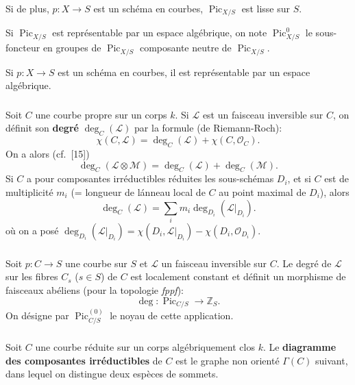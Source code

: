\documentclass{amsart}
\theoremstyle{plain}
\theoremstyle{remark}
\DeclareMathOperator{\Pic}{Pic}
\newcommand{\cO}{\mathcal{O}}
\newcommand{\cL}{\mathcal{L}}
\newcommand{\cM}{\mathcal{M}}
\newcommand{\bbZ}{\mathbb{Z}}
\begin{document}
Si de plus, $p: X \to S$ est un sch\'ema en courbes, $\Pic_{X/S}$ est lisse sur $S$.

Si $\Pic_{X/S}$ est repr\'esentable par un espace alg\'ebrique, on note $\Pic^0_{X/S}$ le
sous-foncteur en groupes de $\Pic_{X/S}$ composante neutre de $\Pic_{X/S}$.

Si $p: X \to S$ est un sch\'ema en courbes, il est repr\'esentable par un espace alg\'ebrique.

\subsubsection{}
Soit $C$ une courbe propre sur un corps $k$. Si $\cL$ est un faisceau inversible sur $C$,
on d\'efinit son \textbf{degr\'e} $\deg_C(\cL)$ par la formule (de Riemann-Roch):
\begin{equation}
\chi(C, \cL) = \deg_C(\cL) + \chi(C, \cO_C).
\end{equation}
On a alors (cf.~[15])
\begin{equation}
\deg_C(\cL \otimes \cM) = \deg_C(\cL) + \deg_C(\cM).
\end{equation}
Si $C$ a pour composantes irr\'eductibles r\'eduites les sous-sch\'emas $D_i$, et si $C$
est de multiplicit\'e $m_i$ (= longueur de l\'anneau local de $C$ au point maximal de $D_i$),
alors
\begin{equation}
\deg_C(\cL) = \sum_i m_i \deg_{D_i}(\cL|_{D_i}).
\end{equation}
o\`u on a pos\'e $\deg_{D_i}(\cL|_{D_i}) = \chi(D_i, \cL|_{D_i}) - \chi(D_i, \cO_{D_i})$.

\subsubsection{}
Soit $p: C \to S$ une courbe sur $S$ et $\cL$ un faisceau inversible sur $C$. Le degr\'e
de $\cL$ sur les fibres $C_s$ ($s \in S$) de $C$ est localement constant et d\'efinit un
morphisme de faisceaux ab\'eliens (pour la topologie \emph{fppf}):
\begin{equation}
\deg: \Pic_{C/S} \to \bbZ_S.
\end{equation}
On d\'esigne par $\Pic^{(0)}_{C/S}$ le noyau de cette application.

\subsubsection{}
Soit $C$ une courbe r\'eduite sur un corps alg\'ebriquement clos $k$. Le
\textbf{diagramme des composantes irr\'eductibles} de $C$ est le graphe non orient\'e
$\Gamma(C)$ suivant, dans lequel on distingue deux esp\`eces de sommets.
\end{document}
